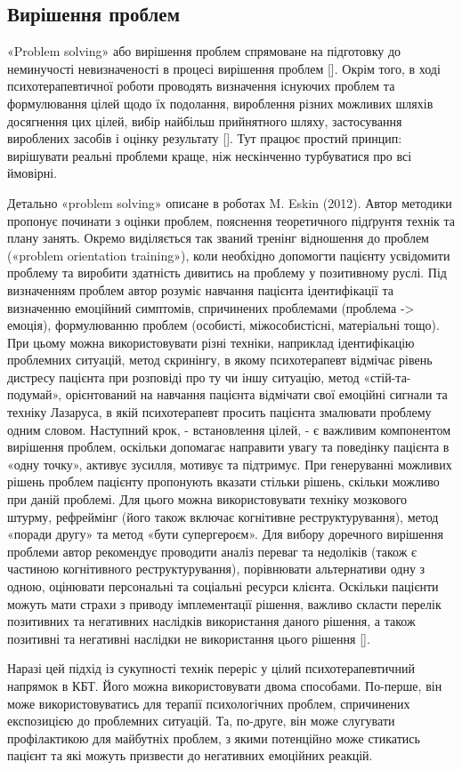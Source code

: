 \documentclass[twocolumn]{article}
\begin{document}
\subsection {Вирішення проблем}
\par «Problem solving» або вирішення проблем спрямоване на підготовку до неминучості невизначеності в процесі вирішення проблем [\cite{bib22}]. Окрім того, в ході психотерапевтичної роботи проводять визначення існуючих проблем та формулювання цілей щодо їх подолання, вироблення різних можливих шляхів досягнення цих цілей, вибір найбільш прийнятного шляху, застосування вироблених засобів і оцінку результату [\cite{bib23}]. Тут працює простий принцип: вирішувати реальні проблеми краще, ніж нескінченно турбуватися про всі ймовірні. 
\par Детально «problem solving» описане в роботах M. Eskin (2012). Автор методики пропонує починати з оцінки проблем, пояснення теоретичного підґрунтя технік та плану занять. Окремо виділяється так званий тренінг відношення до проблем («problem orientation training»), коли необхідно допомогти пацієнту усвідомити проблему та виробити здатність дивитись на проблему у позитивному руслі. Під визначенням проблем автор розуміє навчання пацієнта ідентифікації та визначенню емоційний симптомів, спричинених проблемами (проблема -> емоція), формулюванню проблем (особисті, міжособистісні, матеріальні тощо). При цьому можна використовувати різні техніки, наприклад ідентифікацію проблемних ситуацій, метод скринінгу, в якому психотерапевт відмічає рівень дистресу пацієнта при розповіді про ту чи іншу ситуацію, метод «стій-та-подумай», орієнтований на навчання пацієнта відмічати свої емоційні сигнали та техніку Лазаруса, в якій психотерапевт просить пацієнта змалювати проблему одним словом. Наступний крок, - встановлення цілей, - є важливим компонентом вирішення проблем, оскільки допомагає направити увагу та поведінку пацієнта в «одну точку», активує зусилля, мотивує та підтримує. При генеруванні можливих рішень проблем пацієнту пропонують вказати стільки рішень, скільки можливо при даній проблемі. Для цього можна використовувати техніку мозкового штурму, рефреймінг (його також включає когнітивне реструктурування), метод «поради другу» та метод «бути супергероєм». Для вибору доречного вирішення проблеми автор рекомендує проводити аналіз переваг та недоліків (також є частиною когнітивного реструктурування), порівнювати альтернативи одну з одною, оцінювати персональні та соціальні ресурси клієнта. Оскільки пацієнти  можуть мати страхи з приводу імплементації рішення, важливо скласти перелік позитивних та негативних наслідків використання даного рішення, а також позитивні та негативні наслідки не використання цього рішення [\cite{bib24}].
\par Наразі цей підхід із сукупності технік переріс у цілий психотерапевтичний напрямок в КБТ. Його можна використовувати двома способами. По-перше, він може використовуватись для терапії психологічних проблем, спричинених експозицією до проблемних ситуацій. Та, по-друге, він може слугувати профілактикою для майбутніх проблем, з якими потенційно може стикатись пацієнт та які можуть призвести до негативних емоційних реакцій. 
\end{document}
